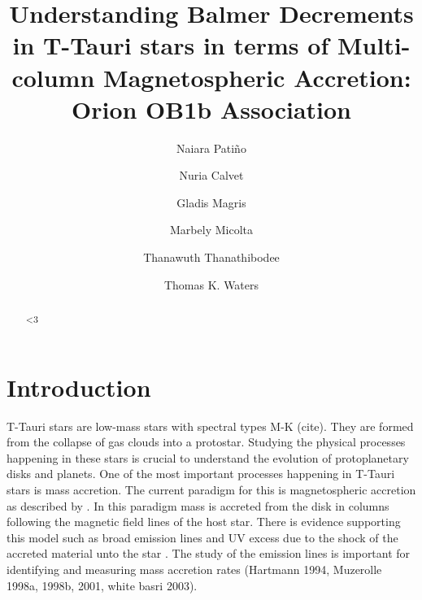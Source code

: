\documentclass[twocolumn,linenumbers]{aastex631}
\begin{document}
\title{Understanding Balmer Decrements in T-Tauri stars in terms of Multi-column Magnetospheric Accretion: Orion OB1b Association}


\author[0009-0009-7455-6777]{Naiara Patiño}

\author[0000-0002-3950-5386]{Nuria Calvet}

\author[0000-0003-1166-5123]{Gladis Magris}

\author[0000-0001-8022-4378]{Marbely Micolta}

\author[0000-0003-4507-1710]{Thanawuth Thanathibodee}

\author[0000-0002-5231-7240]{Thomas K. Waters}




\begin{abstract}

    <3
    
\end{abstract}


\section{Introduction}

T-Tauri stars are low-mass stars with spectral types M-K (cite). They are formed from the collapse of gas clouds into a protostar. Studying the physical processes happening in these stars is crucial to understand the evolution of protoplanetary disks and planets. One of the most important processes happening in T-Tauri stars is mass accretion. The current paradigm for this is magnetospheric accretion as described by \citep{hartmann2016}. In this paradigm mass is accreted from the disk in columns following the magnetic field lines of the host star. There is evidence supporting this model such as broad emission lines \citep{muzerolle2001} and UV excess due to the shock of the accreted material unto the star \citep{calvet_gullbring1998}. The study of the emission lines is important for identifying and measuring mass accretion rates (Hartmann 1994, Muzerolle 1998a, 1998b, 2001, white basri 2003).
\end{document}

